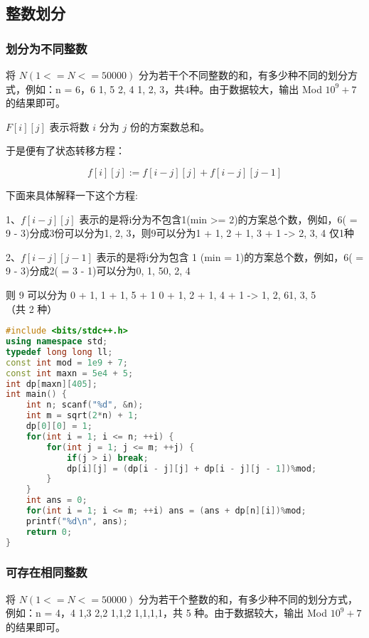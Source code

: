 \subsection{整数划分}

\subsubsection{划分为不同整数}

将 $N (1 <= N <= 50000)$ 分为若干个不同整数的和，有多少种不同的划分方式，例如：n = 6，{6} {1, 5} {2, 4} {1, 2, 3}，共4种。由于数据较大，输出 Mod $10^9 + 7$ 的结果即可。

$F[i][j]$ 表示将数 $i$ 分为 $j$ 份的方案数总和。

于是便有了状态转移方程：

$$f[i][j] := f[i - j][j] + f[i - j][j - 1]$$

下面来具体解释一下这个方程:

1、$f[i - j][j]$ 表示的是将i分为不包含1(min >= 2)的方案总个数，例如，6( = 9 - 3)分成3份可以分为{1, 2, 3}，则9可以分为{1 + 1, 2 + 1, 3 + 1} -> {2, 3, 4} 仅1种

2、$f[i - j][j - 1]$ 表示的是将i分为包含 1 (min = 1)的方案总个数，例如，6( = 9 - 3)分成2( = 3 - 1)可以分为{0, 1, 5}{0, 2, 4}

则 9 可以分为 {0 + 1, 1 + 1, 5 + 1} {0 + 1, 2 + 1, 4 + 1} -> {1, 2, 6}{1, 3, 5}（共 2 种）

\begin{lstlisting}[language=C++]
#include <bits/stdc++.h>
using namespace std;
typedef long long ll;
const int mod = 1e9 + 7;
const int maxn = 5e4 + 5;
int dp[maxn][405];
int main() {
    int n; scanf("%d", &n);
    int m = sqrt(2*n) + 1;
    dp[0][0] = 1;
    for(int i = 1; i <= n; ++i) {
        for(int j = 1; j <= m; ++j) {
            if(j > i) break;
            dp[i][j] = (dp[i - j][j] + dp[i - j][j - 1])%mod;
        }
    }
    int ans = 0;
    for(int i = 1; i <= m; ++i) ans = (ans + dp[n][i])%mod;
    printf("%d\n", ans);
    return 0;
}
\end{lstlisting}

\subsubsection{可存在相同整数}

将 $N (1 <= N <= 50000)$ 分为若干个整数的和，有多少种不同的划分方式，例如：n = 4，{4}  {1,3}  {2,2}  {1,1,2} {1,1,1,1}，共 5 种。由于数据较大，输出 Mod $10^9 + 7$ 的结果即可。

